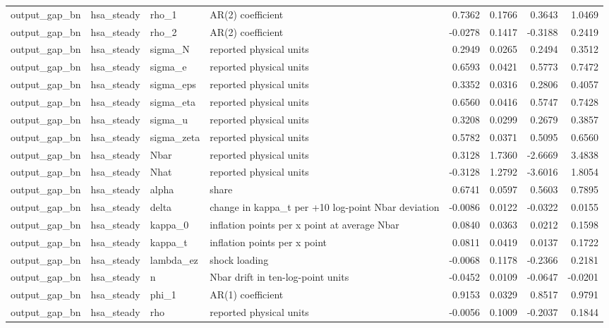 \begin{tabular}{llllrrrr}
output\_gap\_bn & hsa\_steady & rho\_1 & AR(2) coefficient & 0.7362 & 0.1766 & 0.3643 & 1.0469 \\
output\_gap\_bn & hsa\_steady & rho\_2 & AR(2) coefficient & -0.0278 & 0.1417 & -0.3188 & 0.2419 \\
output\_gap\_bn & hsa\_steady & sigma\_N & reported physical units & 0.2949 & 0.0265 & 0.2494 & 0.3512 \\
output\_gap\_bn & hsa\_steady & sigma\_e & reported physical units & 0.6593 & 0.0421 & 0.5773 & 0.7472 \\
output\_gap\_bn & hsa\_steady & sigma\_eps & reported physical units & 0.3352 & 0.0316 & 0.2806 & 0.4057 \\
output\_gap\_bn & hsa\_steady & sigma\_eta & reported physical units & 0.6560 & 0.0416 & 0.5747 & 0.7428 \\
output\_gap\_bn & hsa\_steady & sigma\_u & reported physical units & 0.3208 & 0.0299 & 0.2679 & 0.3857 \\
output\_gap\_bn & hsa\_steady & sigma\_zeta & reported physical units & 0.5782 & 0.0371 & 0.5095 & 0.6560 \\
output\_gap\_bn & hsa\_steady & Nbar & reported physical units & 0.3128 & 1.7360 & -2.6669 & 3.4838 \\
output\_gap\_bn & hsa\_steady & Nhat & reported physical units & -0.3128 & 1.2792 & -3.6016 & 1.8054 \\
output\_gap\_bn & hsa\_steady & alpha & share & 0.6741 & 0.0597 & 0.5603 & 0.7895 \\
output\_gap\_bn & hsa\_steady & delta & change in kappa\_t per +10 log-point Nbar deviation & -0.0086 & 0.0122 & -0.0322 & 0.0155 \\
output\_gap\_bn & hsa\_steady & kappa\_0 & inflation points per x point at average Nbar & 0.0840 & 0.0363 & 0.0212 & 0.1598 \\
output\_gap\_bn & hsa\_steady & kappa\_t & inflation points per x point & 0.0811 & 0.0419 & 0.0137 & 0.1722 \\
output\_gap\_bn & hsa\_steady & lambda\_ez & shock loading & -0.0068 & 0.1178 & -0.2366 & 0.2181 \\
output\_gap\_bn & hsa\_steady & n & Nbar drift in ten-log-point units & -0.0452 & 0.0109 & -0.0647 & -0.0201 \\
output\_gap\_bn & hsa\_steady & phi\_1 & AR(1) coefficient & 0.9153 & 0.0329 & 0.8517 & 0.9791 \\
output\_gap\_bn & hsa\_steady & rho & reported physical units & -0.0056 & 0.1009 & -0.2037 & 0.1844 \\

\end{tabular}
